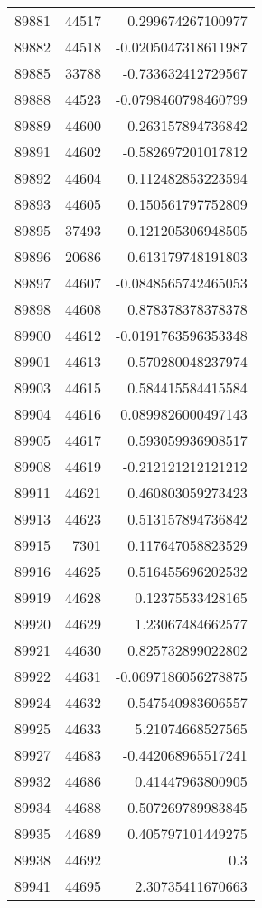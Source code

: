\begin{tabular}{r | r | r}
89881 & 44517 & 0.299674267100977 \\
89882 & 44518 & -0.0205047318611987 \\
89885 & 33788 & -0.733632412729567 \\
89888 & 44523 & -0.0798460798460799 \\
89889 & 44600 & 0.263157894736842 \\
89891 & 44602 & -0.582697201017812 \\
89892 & 44604 & 0.112482853223594 \\
89893 & 44605 & 0.150561797752809 \\
89895 & 37493 & 0.121205306948505 \\
89896 & 20686 & 0.613179748191803 \\
89897 & 44607 & -0.0848565742465053 \\
89898 & 44608 & 0.878378378378378 \\
89900 & 44612 & -0.0191763596353348 \\
89901 & 44613 & 0.570280048237974 \\
89903 & 44615 & 0.584415584415584 \\
89904 & 44616 & 0.0899826000497143 \\
89905 & 44617 & 0.593059936908517 \\
89908 & 44619 & -0.212121212121212 \\
89911 & 44621 & 0.460803059273423 \\
89913 & 44623 & 0.513157894736842 \\
89915 & 7301 & 0.117647058823529 \\
89916 & 44625 & 0.516455696202532 \\
89919 & 44628 & 0.12375533428165 \\
89920 & 44629 & 1.23067484662577 \\
89921 & 44630 & 0.825732899022802 \\
89922 & 44631 & -0.0697186056278875 \\
89924 & 44632 & -0.547540983606557 \\
89925 & 44633 & 5.21074668527565 \\
89927 & 44683 & -0.442068965517241 \\
89932 & 44686 & 0.41447963800905 \\
89934 & 44688 & 0.507269789983845 \\
89935 & 44689 & 0.405797101449275 \\
89938 & 44692 & 0.3 \\
89941 & 44695 & 2.30735411670663 \\

\end{tabular}
